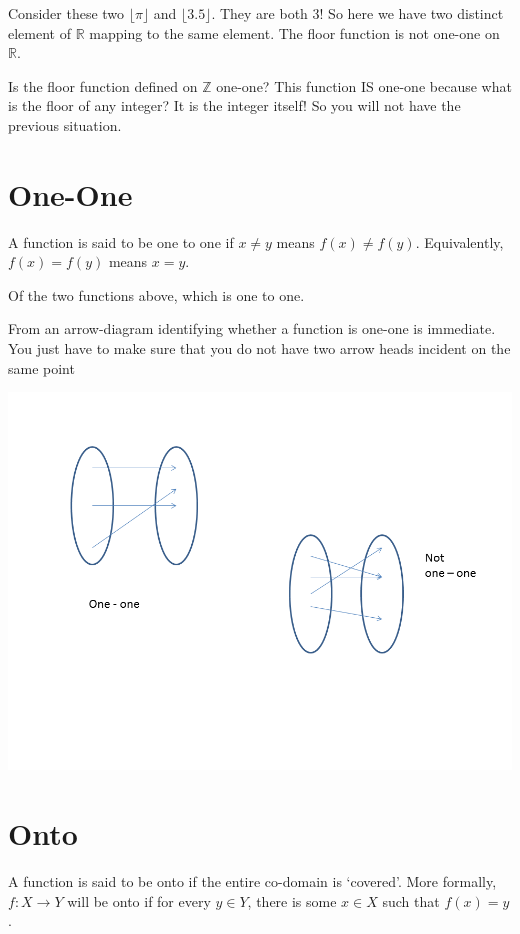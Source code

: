 \documentclass[12pt]{article}
\begin{document}
Consider these two $\lfloor \pi \rfloor$ and $\lfloor 3.5 \rfloor$. They are both 3! So here we have two distinct element of $\mathbb{R}$ mapping to the same element. The floor function is not one-one on $\mathbb{R}$.

\medskip

Is the floor function defined on $\mathbb{Z}$ one-one?
This function IS one-one because what is the floor of any integer? It is the integer itself!
So you will not have the previous situation. 

\section*{One-One}
A function is said to be one to one if $x \neq y$ means $f(x) \neq f(y)$. Equivalently, 
$f(x) = f(y)$ means $x = y$. 

Of the two functions above, which is one to one. 

From an arrow-diagram identifying whether a function is one-one is immediate. You just have to make sure that you do not have two arrow heads incident on the same point

\includegraphics[scale=0.6]{oneone.png}

\section*{Onto}
A function is said to be onto if the entire co-domain is `covered'. More formally, $f:X \rightarrow Y$ will be onto if for every $y \in Y$, there is some $x \in X$ such that $f(x) = y$. 
\end{document}
